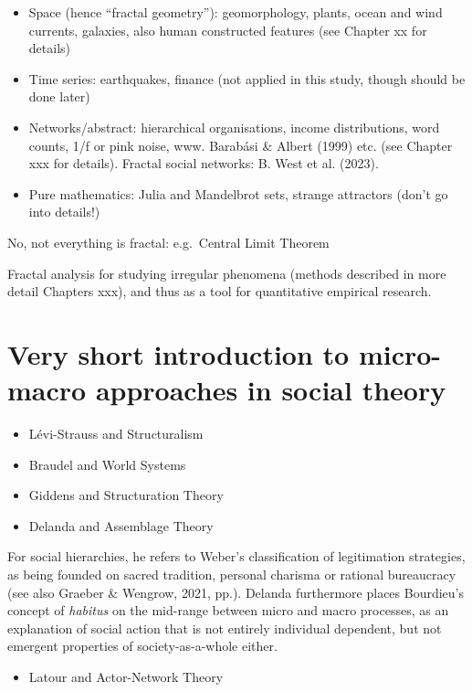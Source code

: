 \documentclass[
  12pt,
]{book}
\providecommand{\tightlist}{%
  \setlength{\itemsep}{0pt}\setlength{\parskip}{0pt}}
\begin{document}
\begin{itemize}
\item
  Space (hence ``fractal geometry''): geomorphology, plants, ocean and wind currents, galaxies, also human constructed features (see Chapter xx for details)
\item
  Time series: earthquakes, finance (not applied in this study, though should be done later)
\item
  Networks/abstract: hierarchical organisations, income distributions, word counts, 1/f or pink noise, www. Barabási \& Albert (1999) etc. (see Chapter xxx for details). Fractal social networks: B. West et al. (2023).
\item
  Pure mathematics: Julia and Mandelbrot sets, strange attractors (don't go into details!)
\end{itemize}

No, not everything is fractal: e.g.~Central Limit Theorem

Fractal analysis for studying irregular phenomena (methods described in more detail Chapters xxx), and thus as a tool for quantitative empirical research.

\hypertarget{very-short-introduction-to-micro-macro-approaches-in-social-theory}{%
\section{Very short introduction to micro-macro approaches in social theory}\label{very-short-introduction-to-micro-macro-approaches-in-social-theory}}

\begin{itemize}
\item
  Lévi-Strauss and Structuralism
\item
  Braudel and World Systems
\item
  Giddens and Structuration Theory
\item
  Delanda and Assemblage Theory
\end{itemize}

For social hierarchies, he refers to Weber's classification of legitimation strategies, as being founded on sacred tradition, personal charisma or rational bureaucracy (see also Graeber \& Wengrow, 2021, pp.). Delanda furthermore places Bourdieu's concept of \emph{habitus} on the mid-range between micro and macro processes, as an explanation of social action that is not entirely individual dependent, but not emergent properties of society-as-a-whole either.

\begin{itemize}
\tightlist
\item
  Latour and Actor-Network Theory
\end{itemize}
\end{document}
